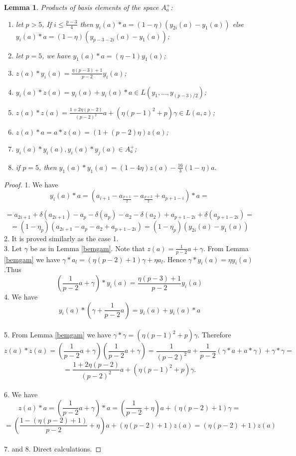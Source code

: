 \documentclass[12pt]{article}
\newcommand\gam{\gamma}
\newtheorem{lem}{Lemma}
\begin{document}
\begin{lem}\label{prod1}
Products of basis elements of the space $A_a^+$:
\begin{enumerate}
\item let $p>5$, If $i\leq \frac{p-3}{4}$ then $y_i(a)*a=(1-\eta)(y_{2i}(a)-y_1(a))$ else $y_i(a)*a=(1-\eta)(y_{p-3-2i}(a)-y_1(a))$;

\item let $p=5$, we have $y_1(a)*a=(\eta-1)y_1(a)$;

\item $z(a)*y_i(a)= \frac{\eta(p-3)+1}{p-2}y_i(a)$;

\item $y_i(a)*z(a)=y_i(a)+y_i(a)*a\in L(y_1,...,y_{(p-3)/2})$;

\item $z(a)*z(a)=\frac{1+2\eta(p-2)}{(p-2)^2}a+(\eta(p-1)^2+p)\gam\in L(a,z)$; 

\item $z(a)*a=a*z(a)=(1+(p-2)\eta)z(a)$;

\item $y_i(a)*y_i(a), y_i(a)*y_j(a)\in A_a^+$;

\item if $p=5$, then $y_1(a)*y_1(a)=(1-4\eta)z(a)-\frac{16}{3}(1-\eta)a.$ 
\end{enumerate}
\end{lem}
\begin{proof}
	
1. We have $$ y_i(a)*a=(a_{i+1}-a_{\frac{p+1}{2}}-a_{\frac{p+3}{2}}+a_{p+1-i})*a=$$

$$=a_{2i+1}+\delta(a_{2i+1})-a_p-\delta(a_p)-a_2-\delta(a_2)+a_{p+1-2i}+\delta(a_{p+1-2i})= $$
$$=(1-\eta_p)(a_{2i+1}-a_p-a_2+a_{p+1-2i})=(1-\eta_p)(y_{2i}(a)-y_1(a))$$
2. It is proved similarly as the case 1.\\
3. Let $\gam$ be as in Lemma \ref{bemgam}. Note that $z(a)=\frac{1}{p-2}a+\gam$. From Lemma \ref{bemgam} we have $\gam*a_l=(\eta(p-2)+1)\gam+\eta a_l$. Hence $\gam*y_i(a)=\eta y_i(a)$.Thus $$(\frac{1}{p-2}a+\gam)*y_i(a)=\frac{\eta(p-3)+1}{p-2}y_i(a)$$
4. We have $$ y_i(a)*(\gam +\frac{1}{p-2}a)=y_i(a)+y_i(a)*a$$ \\
5. From Lemma \ref{bemgam} we have $\gam*\gam=(\eta(p-1)^2+p) \gam$. Therefore $$z(a)*z(a)=(\frac{1}{p-2}a+\gam)(\frac{1}{p-2}a+\gam)=\frac{1}{(p-2)^2}a+\frac{1}{p-2}(\gam*a+a*\gam)+\gam*\gam=$$
$$=\frac{1+2\eta(p-2)}{(p-2)^2}a+(\eta(p-1)^2+p)\gam.$$
\\
6. We have $$z(a)*a=(\frac{1}{p-2}a+\gam)*a=(\frac{1}{p-2}+\eta)a+(\eta(p-2)+1)\gam=$$
$$=(\frac{1-(\eta(p-2)+1)}{p-2}+\eta)a+ (\eta(p-2)+1)z(a)=(\eta(p-2)+1)z(a)$$\\
7. and 8. Direct calculations.
\end{proof}
\end{document}
